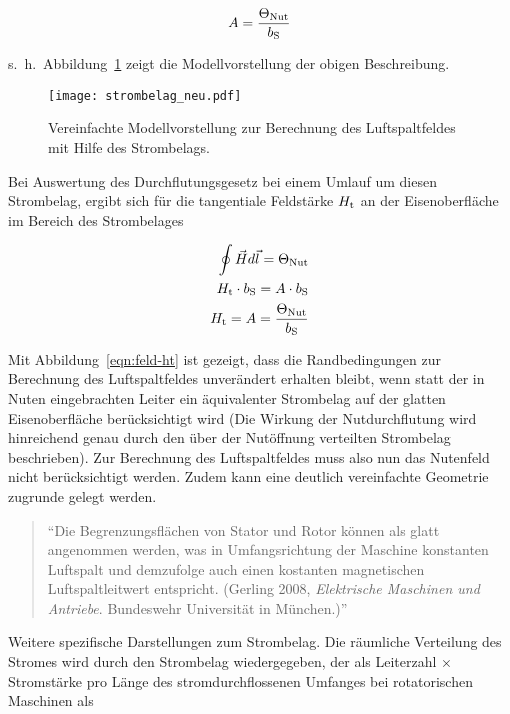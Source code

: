 \begin{align}
A = \frac{\Theta_{\mathrm{Nut}}}{b_{\mathrm{S}}}
\end{align}

s.~h.~Abbildung~\ref{fig:strombelag-neu} zeigt die Modellvorstellung der obigen Beschreibung.

\begin{figure}[!h]
\centering
\texttt{[image: strombelag\_neu.pdf]}
\label{fig:strombelag-neu}
\caption{Vereinfachte Modellvorstellung zur Berechnung des Luftspaltfeldes mit Hilfe des Strombelags.}
\end{figure}

Bei Auswertung des Durchflutungsgesetz bei einem Umlauf um diesen Strombelag, ergibt sich für die tangentiale Feldstärke $H_{\mathrm{t}}$ an der Eisenoberfläche im Bereich des Strombelages

\begin{align}
\oint \vec{H}d\vec{l} = \Theta_{\mathrm{Nut}} \\
H_{\mathrm{t}}\cdot b_{\mathrm{S}} = A\cdot b_{\mathrm{S}} \\
H_{\mathrm{t}} = A = \frac{\Theta_{\mathrm{Nut}}}{b_{\mathrm{S}}} \label{eqn:feld-ht}
\end{align}

Mit Abbildung~\ref{eqn:feld-ht} ist gezeigt, dass die Randbedingungen zur Berechnung des Luftspaltfeldes unverändert erhalten bleibt, wenn statt der in Nuten eingebrachten Leiter ein äquivalenter Strombelag auf der glatten Eisenoberfläche berücksichtigt wird (Die Wirkung der Nutdurchflutung wird hinreichend genau durch den über der Nutöffnung verteilten Strombelag beschrieben).
Zur Berechnung des Luftspaltfeldes muss also nun das Nutenfeld nicht berücksichtigt werden.
Zudem kann eine deutlich vereinfachte Geometrie zugrunde gelegt werden.

\begin{quote}
\enquote{Die Begrenzungsflächen von Stator und Rotor können als glatt angenommen werden, was in Umfangsrichtung der Maschine konstanten Luftspalt und demzufolge auch einen kostanten magnetischen Luftspaltleitwert entspricht. (Gerling 2008, \emph{Elektrische Maschinen und Antriebe}. Bundeswehr Universität in München.)}
\end{quote}

Weitere spezifische Darstellungen zum Strombelag.
Die räumliche Verteilung des Stromes wird durch den Strombelag wiedergegeben, der als Leiterzahl $\times$ Stromstärke pro Länge des stromdurchflossenen Umfanges bei rotatorischen Maschinen als \autocite[S.~199]{hofmann2013}

